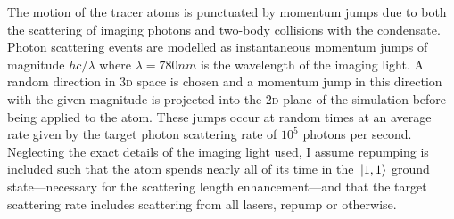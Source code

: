 The motion of the tracer atoms is punctuated by momentum jumps due to both the scattering of imaging photons and two-body collisions with the condensate. Photon scattering events are modelled as instantaneous momentum jumps of magnitude $hc/\lambda$ where $\lambda=780\unit{nm}$ is the wavelength of the imaging light. A random direction in \textsc{3d} space is chosen and a momentum jump in this direction with the given magnitude is projected into the \textsc{2d} plane of the simulation before being applied to the atom. These jumps occur at random times at an average rate given by the target photon scattering rate of $10^5$ photons per second. Neglecting the exact details of the imaging light used, I assume repumping is included such that the atom spends nearly all of its time in the $\ket{1, 1}$ ground state---necessary for the scattering length enhancement---and that the target scattering rate includes scattering from all lasers, repump or otherwise.

